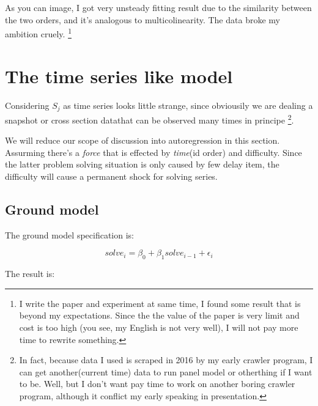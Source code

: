 \documentclass{article}
\begin{document}
As you can image, I got very unsteady fitting result due to the similarity between the two orders, and it's analogous
to multicolinearity. The data broke my ambition cruely. \footnote{I write the paper and experiment at same time,
I found some result that is beyond my expectations. Since the the value of the paper is very limit and cost is too high
(you see, my English is not very well), I will not pay more time to rewrite something.}

\section{The time series like model}

Considering $S_j$ as time series looks little strange, since obviousily we are dealing a snapshot or cross section 
datathat can be observed many times in principe \footnote{In fact, because data I used is scraped in 2016 
by my early crawler program, I can get another(current time) data to run panel model or otherthing 
if I want to be. Well, but I don't want pay time to work on another boring crawler program, 
although it conflict my early speaking in presentation.}.

We will reduce our scope of discussion into autoregression in this section. Assurming there's a \textit{force}
that is effected by \textit{time}(id order) and difficulty. Since the latter problem solving situation
is only caused by few delay item, the difficulty will cause a permanent shock for solving series.

\subsection{Ground model}

The ground model specification is:

\[
solve_i = \beta_0 + \beta_1 solve_{i-1} + \epsilon_i
\]

The result is:
\end{document}
